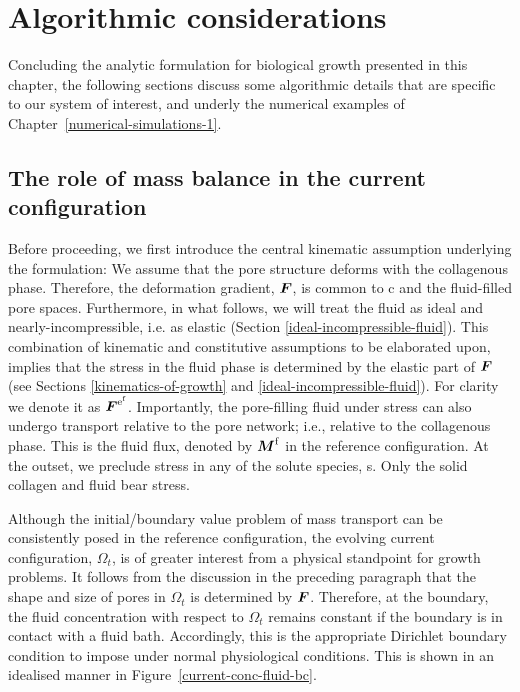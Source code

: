 \section{Algorithmic considerations}
\label{algorithmic-considerations}

Concluding the analytic formulation for biological growth presented in
this chapter, the following sections discuss some algorithmic details
that are specific to our system of interest, and underly the numerical
examples of Chapter~\ref{numerical-simulations-1}.

\subsection{The role of mass balance in the current
  configuration}
\label{role-of-current-mass-balance}



Before proceeding, we first introduce the central kinematic assumption
underlying the formulation: We assume that the pore structure deforms
with the collagenous phase. Therefore, the deformation gradient,
$\mbox{\boldmath$ F$}$, is common to c and the fluid-filled pore spaces. Furthermore,
in what follows, we will treat the fluid as ideal and
nearly-incompressible, i.e. as elastic (Section
\ref{ideal-incompressible-fluid}). This combination of kinematic and
constitutive assumptions to be elaborated upon, implies that the
stress in the fluid phase is determined by the elastic part of $\mbox{\boldmath$ F$}$
(see Sections \ref{kinematics-of-growth} and
\ref{ideal-incompressible-fluid}). For clarity we denote it as
$\mbox{\boldmath$ F$}^{\mathrm{e}^\mathrm{f}}$. Importantly, the pore-filling fluid
under stress can also undergo transport relative to the pore network;
i.e., relative to the collagenous phase. This is the fluid flux,
denoted by $\mbox{\boldmath$ M$}^\mathrm{f}$ in the reference configuration. At the
outset, we preclude stress in any of the solute species, s. Only the
solid collagen and fluid bear stress.

Although the initial/boundary value problem of mass transport can be
consistently posed in the reference configuration, the evolving
current configuration, $\Omega_t$, is of greater interest from a
physical standpoint for growth problems. It follows from the
discussion in the preceding paragraph that the shape and size of pores
in $\Omega_t$ is determined by $\mbox{\boldmath$ F$}$. Therefore, at the boundary, the
fluid concentration with respect to $\Omega_t$ remains constant if the
boundary is in contact with a fluid bath.  Accordingly, this is the
appropriate Dirichlet boundary condition to impose under normal
physiological conditions. This is shown in an idealised manner in
Figure~\ref{current-conc-fluid-bc}.

